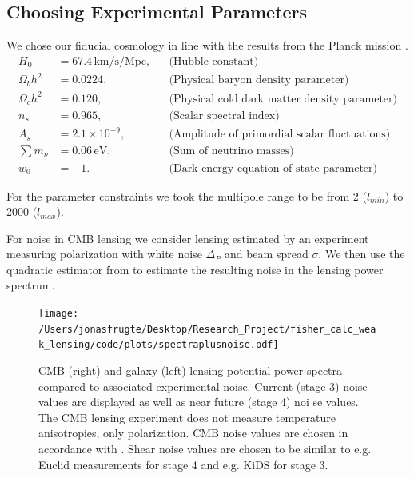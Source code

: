 \documentclass[11pt]{article} %
\begin{document}
\subsection{Choosing Experimental Parameters}
We chose our fiducial cosmology in line with the results from the Planck mission \cite{planckresults}.
\begin{align*}
    H_0 &= 67.4 \, \text{km/s/Mpc}, && \text{(Hubble constant)} \\
    \Omega_b h^2 &= 0.0224, && \text{(Physical baryon density parameter)} \\
    \Omega_c h^2 &= 0.120, && \text{(Physical cold dark matter density parameter)} \\
    n_s &= 0.965, && \text{(Scalar spectral index)} \\
    A_s &= 2.1 \times 10^{-9}, && \text{(Amplitude of primordial scalar fluctuations)} \\
    \sum m_\nu &= 0.06 \, \text{eV}, && \text{(Sum of neutrino masses)} \\
    w_0 &= -1. && \text{(Dark energy equation of state parameter)}
\end{align*}

For the parameter constraints we took the multipole range to be from 2 ($l_{min}$) to 2000 ($l_{max}$).


For noise in CMB lensing we consider lensing estimated by an experiment measuring polarization with white noise $\Delta_P$ and beam spread $\sigma$. We then use the quadratic estimator from \cite{Hu_2002} to estimate the resulting noise in the lensing power spectrum.

\begin{figure}[t]
    \centering
    \texttt{[image: /Users/jonasfrugte/Desktop/Research\_Project/fisher\_calc\_weak\_lensing/code/plots/spectraplusnoise.pdf]}
    \caption{CMB (right) and galaxy (left) lensing potential power spectra compared to associated experimental noise. Current (stage 3) noise values are displayed as well as near future (stage 4) noi se values. The CMB lensing experiment does not measure temperature anisotropies, only polarization. CMB noise values are chosen in accordance with \cite{Namikawa_2016}. Shear noise values are chosen to be similar to e.g. Euclid measurements for stage 4 and e.g. KiDS for stage 3.}
    \label{fig:lpsplusnoise}
\end{figure}
\end{document}
